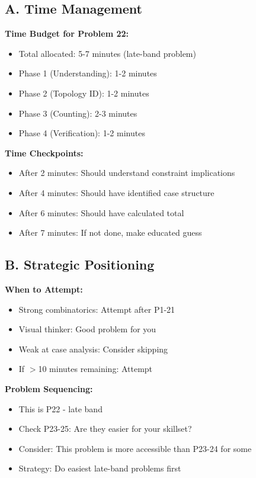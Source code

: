\documentclass[12pt]{article}
\begin{document}
\begin{competitionbox}

\subsection*{A. Time Management}

\textbf{Time Budget for Problem 22:}
\begin{itemize}
    \item Total allocated: 5-7 minutes (late-band problem)
    \item Phase 1 (Understanding): 1-2 minutes
    \item Phase 2 (Topology ID): 1-2 minutes
    \item Phase 3 (Counting): 2-3 minutes
    \item Phase 4 (Verification): 1-2 minutes
\end{itemize}

\textbf{Time Checkpoints:}
\begin{itemize}
    \item After 2 minutes: Should understand constraint implications
    \item After 4 minutes: Should have identified case structure
    \item After 6 minutes: Should have calculated total
    \item After 7 minutes: If not done, make educated guess
\end{itemize}

\subsection*{B. Strategic Positioning}

\textbf{When to Attempt:}
\begin{itemize}
    \item Strong combinatorics: Attempt after P1-21
    \item Visual thinker: Good problem for you
    \item Weak at case analysis: Consider skipping
    \item If $>$10 minutes remaining: Attempt
\end{itemize}

\textbf{Problem Sequencing:}
\begin{itemize}
    \item This is P22 - late band
    \item Check P23-25: Are they easier for your skillset?
    \item Consider: This problem is more accessible than P23-24 for some
    \item Strategy: Do easiest late-band problems first
\end{itemize}


\end{competitionbox}
\end{document}
